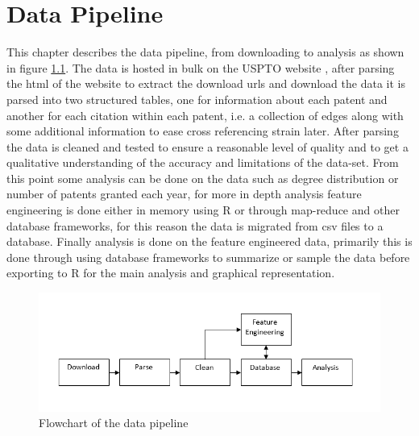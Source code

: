 
\chapter{Data Pipeline} %

\label{Chapter3} %

This chapter describes the data pipeline, from downloading to analysis as shown in figure \ref{fig:pipelineFlowChart}. The data is hosted in bulk on the USPTO website \cite{USPTObulkdata}, after parsing the html of the website to extract the download urls and download the data it is parsed into two structured tables, one for information about each patent and another for each citation within each patent, i.e. a collection of edges along with some additional information to ease cross referencing strain later. After parsing the data is cleaned and tested to ensure a reasonable level of quality and to get a qualitative understanding of the accuracy and limitations of the data-set. From this point some analysis can be done on the data such as degree distribution or number of patents granted each year, for more in depth analysis feature engineering is done either in memory using R or through map-reduce and other database frameworks, for this reason the data is migrated from csv files to a database. Finally analysis is done on the feature engineered data, primarily this is done through using database frameworks to summarize or sample the data before exporting to R for the main analysis and graphical representation. 


\begin{figure}[ht]
\centering
  \centering
\includegraphics[width=0.7\linewidth]{Figures/FlowChart}
\caption[Flowchart: Data Pipeline]{\small Flowchart of the data pipeline}
\label{fig:pipelineFlowChart}
\end{figure}



